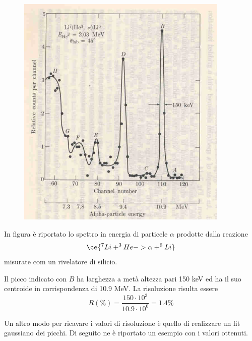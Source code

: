 \begin{esempio}
   \begin{minipage}{0.395\textwidth}
      \begin{figure}[H]
         \centering
         \includegraphics[width=0.9\textwidth]{immagini/spettro_alpha_riv_silicio.png}
      \end{figure}
   \end{minipage}
   \begin{minipage}{0.6\textwidth}
      \vspace{0.3cm}In figura è riportato lo spettro in energia di particele $\alpha$ prodotte dalla reazione
      \begin{equation*}
         \ce{^7Li + ^3 He -> {\alpha} + ^6Li}
      \end{equation*}
      misurate com un rivelatore di silicio.
   
      Il picco indicato con $B$ ha larghezza a metà altezza pari 150 keV ed ha il suo centroide in corrispondenza di 10.9 MeV. La risoluzione risulta essere
      \begin{equation*}
         R(\%)=\frac{150 \cdot 10^3}{10.9 \cdot 10^6}=1.4\%
      \end{equation*}
   \end{minipage}
   
   \vspace{0.6cm}Un altro modo per ricavare i valori di risoluzione è quello di realizzare un fit gaussiano dei picchi. Di seguito ne è riportato un esempio con i valori ottenuti.


\end{esempio}
